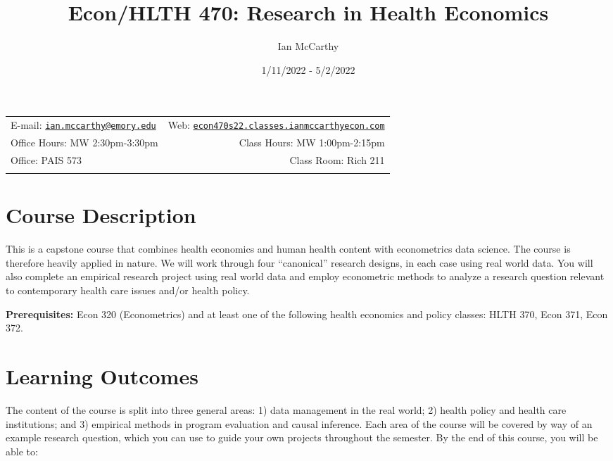 \documentclass[11pt,]{article}
\title{Econ/HLTH 470: Research in Health Economics}
\author{Ian McCarthy}
\date{1/11/2022 - 5/2/2022}
\begin{document}
  

		\maketitle
		
	
		\thispagestyle{firststyle}



	\noindent \begin{tabular*}{\textwidth}{ @{\extracolsep{\fill}} lr @{\extracolsep{\fill}}}


E-mail: \texttt{\href{mailto:ian.mccarthy@emory.edu}{\nolinkurl{ian.mccarthy@emory.edu}}} & Web: \href{http://econ470s22.classes.ianmccarthyecon.com}{\tt econ470s22.classes.ianmccarthyecon.com}\\
Office Hours: MW 2:30pm-3:30pm  &  Class Hours: MW 1:00pm-2:15pm\\
Office: PAIS 573  & Class Room: Rich 211\\
	&  \\
	\hline
	\end{tabular*}
	
\vspace{2mm}
	


\hypertarget{course-description}{%
\section{Course Description}\label{course-description}}

This is a capstone course that combines health economics and human
health content with econometrics data science. The course is therefore
heavily applied in nature. We will work through four ``canonical''
research designs, in each case using real world data. You will also
complete an empirical research project using real world data and employ
econometric methods to analyze a research question relevant to
contemporary health care issues and/or health policy.

\textbf{Prerequisites:} Econ 320 (Econometrics) and at least one of the
following health economics and policy classes: HLTH 370, Econ 371, Econ
372.

\hypertarget{learning-outcomes}{%
\section{Learning Outcomes}\label{learning-outcomes}}

The content of the course is split into three general areas: 1) data
management in the real world; 2) health policy and health care
institutions; and 3) empirical methods in program evaluation and causal
inference. Each area of the course will be covered by way of an example
research question, which you can use to guide your own projects
throughout the semester. By the end of this course, you will be able to:
\end{document}
